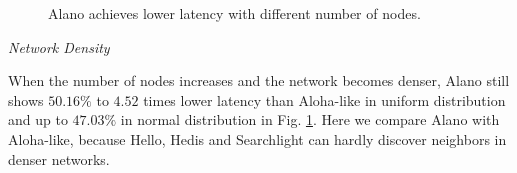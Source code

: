 \begin{figure}[!t]
\centering
{}
\hspace{0.01in}
\caption{Alano achieves lower latency with different number of nodes.}
\label{fig_node}
\end{figure}

\emph{Network Density} 

When the number of nodes increases and the network becomes denser, Alano still shows $50.16\%$ to $4.52$ times lower latency than Aloha-like in uniform distribution and up to $47.03\%$ in normal distribution in Fig. \ref{fig_node}. Here we compare Alano with Aloha-like, because Hello, Hedis and Searchlight can hardly discover neighbors in denser networks. 


